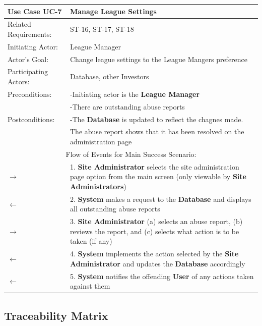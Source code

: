 \begin{centering}
\renewcommand\arraystretch{1.3} %
\label{UC-7}
\begin{longtable}{|p{1.2in} p{5in}|}
\hline
\bfseries{\color{color1}Use Case UC-7} &
\bfseries{\color{color1}Manage League Settings} \\
\hline
Related Requirements: & ST-16, ST-17, ST-18 \\
Initiating Actor:     & League Manager \\
Actor's Goal:         & Change league settings to the League Mangers preference \\
Participating Actors: & Database, other Investors \\
Preconditions:        & -Initiating actor is the \textbf{League Manager} \\
                      & -There are outstanding abuse reports \\
Postconditions:       & -The \textbf{Database} is updated to reflect the chagnes made. \\
 & The abuse report shows that it has been resolved on the administration page\\
\hline
\multicolumn{2}{|c|}{\color{color1}Flow of Events for Main Success Scenario:}\\
\hline
$\rightarrow$ & 1. \textbf{Site Administrator} selects the site administration page option from the main screen (only viewable by \textbf{Site Administrators}) \\
$\leftarrow$ & 2. \textbf{System} makes a request to the \textbf{Database} and displays all outstanding abuse reports\\
$\rightarrow$ & 3. \textbf{Site Administrator} (a) selects an abuse report, (b) reviews the report, and (c) selects what action is to be taken (if any)\\
$\leftarrow$ & 4. \textbf{System} implements the action selected by the \textbf{Site Administrator} and updates the \textbf{Database} accordingly \\
$\leftarrow$ & 5. \textbf{System} notifies the offending \textbf{User} of any actions taken against them \\
\hline
\end{longtable}
\end{centering}

\subsection{Traceability Matrix}

